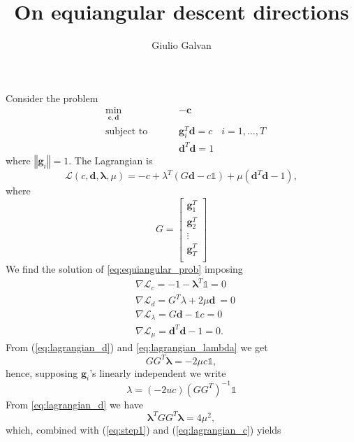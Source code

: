 \documentclass{article}
\title{On equiangular descent directions}
\author{Giulio Galvan}
\renewcommand{\vec}[1]{\boldsymbol{#1}}
\newcommand{\norm}[1]{\left\Vert #1 \right\Vert}
\newcommand{\onevec}{\mathds{1}}
\begin{document}
	\maketitle
	
\noindent
Consider the problem
\begin{equation}
\label{eq:equiangular_prob}
\begin{aligned}
& \min_{\vec{c},\vec{d}} &&&&-\vec{c} &\\
& \text{subject to} &&&& \vec{g}_i^T\vec{d} = c & i = 1, \ldots, T\\
& &&&&\vec{d}^T\vec{d} = 1&
\end{aligned}
\end{equation}
where $\norm{\vec{g}_i}=1$.
The Lagrangian is
\begin{equation}
	\mathcal{L}(c,\vec{d},\vec{\lambda},\mu) = -c +\lambda^T(G\vec{d}-c \onevec)+ \mu(\vec{d}^T\vec{d}-1),
\end{equation} where
\begin{equation}
G=\begin{bmatrix}
\vec{g}_1^T \\
\vec{g}_2^T \\
\vdots\\
\vec{g}_T^T\\
\end{bmatrix}
\end{equation}
We find the solution of \ref{eq:equiangular_prob} imposing
\begin{align}
\label{eq:lagrangian_c}
&\nabla \mathcal{L}_c = -1 - \vec{\lambda}^T \onevec =0\\
\label{eq:lagrangian_d}
&\nabla \mathcal{L}_d = G^T\lambda + 2\mu\vec{d}\ =0\\
\label{eq:lagrangian_lambda}
&\nabla \mathcal{L}_\lambda = G\vec{d} -\onevec c =0\\
\label{eq:lagrangian_mu}
&\nabla \mathcal{L}_\mu = \vec{d}^T\vec{d}-1 =0.
\end{align}
From (\ref{eq:lagrangian_d}) and \ref{eq:lagrangian_lambda} we get
\begin{equation}
	\label{eq:step1}
	GG^T\vec{\lambda} = -2\mu c \onevec,
\end{equation}hence, supposing $\vec{g}_i$'s linearly independent we write
\begin{equation}
	\lambda = (-2uc)(GG^T)^{-1} \onevec
\end{equation}
From \ref{eq:lagrangian_d} we have
\begin{equation}
\label{eq:step2}
	\vec{\lambda}^T GG^T \vec{\lambda} = 4\mu^2,
\end{equation} which, combined with (\ref{eq:step1}) and (\ref{eq:lagrangian_c}) yields
\end{document}
